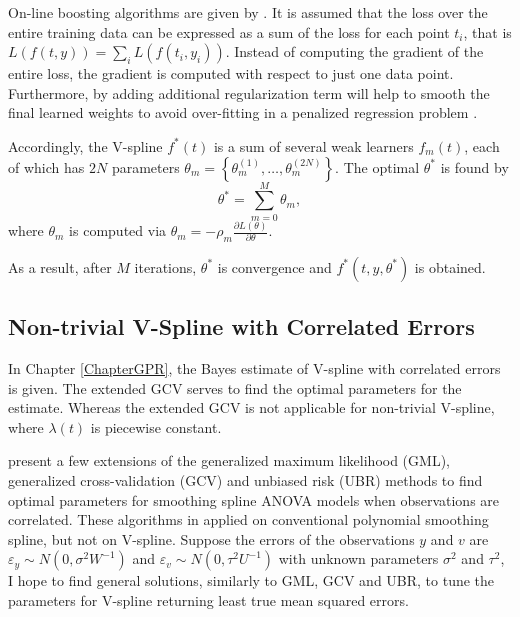 On-line boosting algorithms are given by \cite{babenko2009family, beygelzimer2015online}. It is assumed that the loss over the entire training data can be expressed as a sum of the loss for each point $t_i$, that is $L(f(t,y))=\sum_i L(f(t_i,y_i))$. Instead of computing the gradient of the entire loss, the gradient is computed with respect to just one data point. Furthermore, by adding additional regularization term will help to smooth the final learned weights to avoid over-fitting in a penalized regression problem \citep{chen2016xgboost}. 

Accordingly, the V-spline $f^*(t)$ is a sum of several weak learners $f_m(t)$, each of which has $2N$ parameters $\theta_m=\left\lbrace \theta_m^{(1)},\ldots,\theta_m^{(2N)}\right\rbrace$. The optimal $\theta^*$ is found by 
\begin{equation*}
\theta^*=\sum_{m=0}^{M}\theta_m,
\end{equation*}
where $\theta_m$ is computed via $\theta_m=-\rho_m\frac{\partial L(\theta)}{\partial \theta}$. 

As a result, after $M$ iterations, $\theta^*$ is convergence and $f^*(t,y,\theta^*)$ is obtained. 



\subsection*{Non-trivial V-Spline with Correlated Errors}

In Chapter \ref{ChapterGPR}, the Bayes estimate of V-spline with correlated errors is given. The extended GCV serves to find the optimal parameters for the estimate. Whereas the extended GCV is not applicable for non-trivial V-spline, where $\lambda(t)$ is piecewise constant. 

\cite{opsomer2001nonparametric, wang1998smoothing} present a few extensions of the generalized maximum likelihood (GML), generalized cross-validation (GCV) and unbiased risk (UBR) methods to find optimal parameters for smoothing spline ANOVA models when observations are correlated. These algorithms in applied on conventional polynomial smoothing spline, but not on V-spline. Suppose the errors of the observations $y$ and $v$ are $\varepsilon_y\sim N\left(0,\sigma^2W^{-1}\right)$ and $\varepsilon_v\sim N\left(0,\tau^2U^{-1}\right)$ with unknown parameters $\sigma^2$ and $\tau^2$, I hope to find general solutions, similarly to GML, GCV and UBR, to tune the parameters for V-spline returning least true mean squared errors. 




